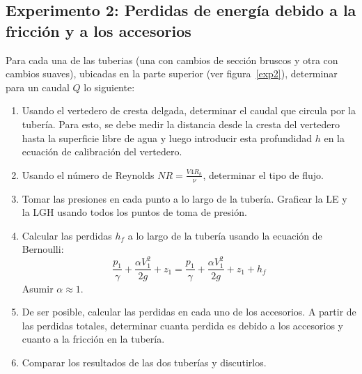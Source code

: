 \documentclass[10pt, a4paper]{exam}
\begin{document}
\subsection{Experimento 2: Perdidas de energ\'ia debido a la fricci\'on y a los accesorios}
Para cada una de las tuberias (una con cambios de secci\'on bruscos y otra con cambios suaves), ubicadas en la parte superior (ver figura~\ref{exp2}), determinar para un caudal $Q$ lo siguiente:
\begin{enumerate}
    \item Usando el vertedero de cresta delgada, determinar el caudal que circula por la tuber\'ia. Para esto, se debe medir la distancia desde la cresta del vertedero hasta la superficie libre de agua y luego introducir esta profundidad $h$ en la ecuaci\'on de calibraci\'on del vertedero. 
    \item Usando el n\'umero de Reynolds $NR = \frac{V4R_h}{\nu}$, determinar el tipo de flujo.
    \item Tomar las presiones en cada punto a lo largo de la tuber\'ia. Graficar la LE y la LGH usando todos los puntos de toma de presi\'on.
    \item Calcular las perdidas $h_f$ a lo largo de la tuber\'ia usando la ecuaci\'on de Bernoulli:
    $$
    \frac{p_1}{\gamma}+\frac{\alpha V_1^2}{2g} + z_1 = \frac{p_1}{\gamma}+\frac{\alpha V_1^2}{2g} + z_1 + h_f
    $$
    Asumir $\alpha \approx 1$.
    \item De ser posible, calcular las perdidas en cada uno de los accesorios. A partir de las perdidas totales, determinar cuanta perdida es debido a los accesorios y cuanto a la fricci\'on en la tuber\'ia.
    \item Comparar los resultados de las dos tuber\'ias y discutirlos.
\end{enumerate}
\end{document}
